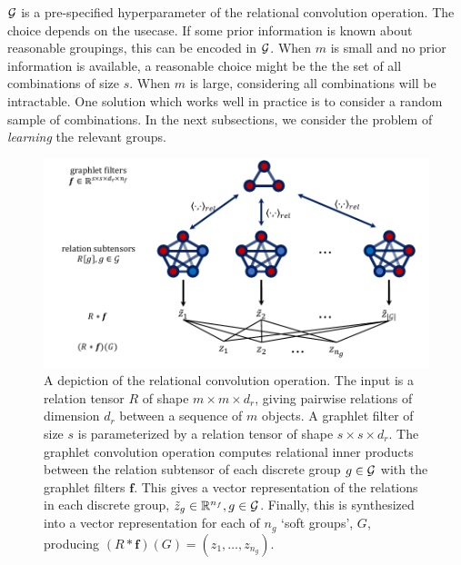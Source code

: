 ${\mathcal{G}}$ is a pre-specified hyperparameter of the relational convolution operation. The choice depends on the usecase. If some prior information is known about reasonable groupings, this can be encoded in ${\mathcal{G}}$. When $m$ is small and no prior information is available, a reasonable choice might be the the set of all combinations of size $s$. When $m$ is large, considering all combinations will be intractable. One solution which works well in practice is to consider a random sample of combinations. In the next subsections, we consider the problem of \textit{learning} the relevant groups.


\begin{figure}[!ht]
    \includegraphics[width=\textwidth]{figs/relconv_diagram2.pdf}
    \caption{A depiction of the relational convolution operation. The input is a relation tensor $R$ of shape $m \times m \times d_r$, giving pairwise relations of dimension $d_r$ between a sequence of $m$ objects. A graphlet filter of size $s$ is parameterized by a relation tensor of shape $s \times s \times d_r$. The graphlet convolution operation computes relational inner products between the relation subtensor of each discrete group $g \in {\mathcal{G}}$ with the graphlet filters $\bm{f}$. This gives a vector representation of the relations in each discrete group, $\tilde{z}_g \in \mathbb{R}^{n_f}, g \in {\mathcal{G}}$. Finally, this is synthesized into a vector representation for each of $n_g$ `soft groups', $G$, producing $(R \ast \bm{f})(G) = (z_1, \ldots, z_{n_g})$.}\label{fig:relconvdiagram}
\end{figure}


